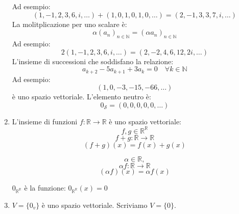 \documentclass[a4paper]{article}
\theoremstyle{break}
\theoremstyle{break}
\theoremstyle{break}
\theoremstyle{break}
\begin{document}
\begin{enumerate}
\[      \] 
      Ad esempio:
      \[
        (1,-1,2,3,6,i, \ldots) + (1,0,1,0,1,0, \ldots) = (2,-1,3,3,7,i, \ldots)
      \] 
      La molitplicazione per uno scalare è:
      \[
        \alpha(a_n)_{n \in \mathbb{N}} = (\alpha a_n)_{n \in \mathbb{N}}
      \] 
      Ad esempio:
      \[
        2(1,-1,2,3,6,i, \ldots) = (2,-2,4,6,12,2i, \ldots)
      \] 
      L'insieme di successioni che soddisfano la relazione:
      \[
        a_{k+2} -5a_{k+1} + 3a_k = 0 \quad \forall k \in \mathbb{N}
      \] 
      Ad esempio:
      \[
        (1,0,-3,-15,-66, \ldots)
      \] 
      è uno spazio vettoriale. L'elemento neutro è:
      \[
        0_{\mathcal{S}} = (0,0,0,0,0, \ldots)
      \] 
    \item L'insieme di funzioni \( f: \mathbb{R} \to \mathbb{R} \) è uno spazio vettoriale:
      \[
      f,g \in \mathbb{R}^\mathbb{R}
      \] 
      \[
      f+g: \mathbb{R} \to \mathbb{R}
      \] 
      \[
        (f+g)(x) = f(x) + g(x)
      \] 

      \[
      \alpha \in \mathbb{R},
      \] 
      \[
      \alpha f: \mathbb{R} \to \mathbb{R}
      \] 
      \[
      (\alpha f)(x) = \alpha f(x)
      \] 

      \( 0_{\mathbb{R}^\mathbb{R}} \) è la funzione: \( 0_{\mathbb{R}^\mathbb{R}}(x) =0 \) 

    \item \( V = \{0_v\}  \) è uno spazio vettoriale. Scriviamo \( V = \{0\} \).
  \end{enumerate}
\end{document}
